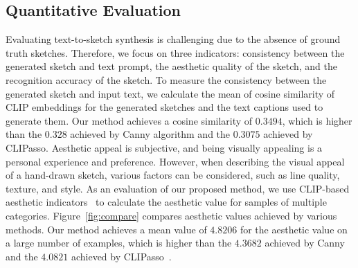 \documentclass{article}
\begin{document}
\subsection{Quantitative Evaluation}
\label{sec:quantitative}
Evaluating text-to-sketch synthesis is challenging due to the absence of ground truth sketches. Therefore, we focus on three indicators: consistency between the generated sketch and text prompt, the aesthetic quality of the sketch, and the recognition accuracy of the sketch.
To measure the consistency between the generated sketch and input text, we calculate the mean of cosine similarity of CLIP embeddings for the generated sketches and the text captions used to generate them. Our method achieves a cosine similarity of $0.3494$, which is higher than the $0.328$ achieved by  Canny algorithm and the $0.3075$ achieved by CLIPasso.
Aesthetic appeal is subjective, and being visually appealing is a personal experience and preference. However, when describing the visual appeal of a hand-drawn sketch, various factors can be considered, such as line quality, texture, and style. As an evaluation of our proposed method, we use CLIP-based aesthetic indicators~\cite{aesthetic_predictor} to calculate the aesthetic value for samples of multiple categories. Figure~\ref{fig:compare} compares aesthetic values achieved by various methods. Our method achieves a mean value of $4.8206$ for the aesthetic value on a large number of examples, which is higher than the $4.3682$ achieved by  Canny and the $4.0821$ achieved by CLIPasso~\cite{vinker_2022_clipasso}.
\end{document}
